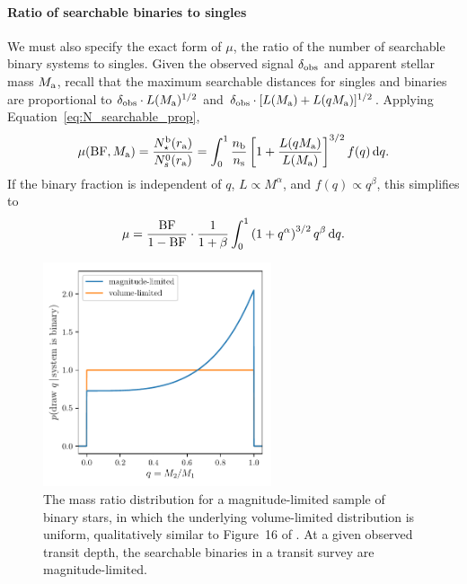 \documentclass[12pt,modern]{aastex61}
\renewcommand{\a}{_{\rm a}}
\begin{document}
\paragraph{Ratio of searchable binaries to singles}
We must also specify the exact form of $\mu$, the ratio of 
the number of searchable binary systems to singles.
Given the observed signal $\delta_{\rm obs}$ and apparent stellar mass $M\a$, 
recall that the maximum searchable distances for singles and binaries are 
proportional to $\delta_{\rm obs}\cdot L(M\a)^{1/2}$ and $\delta_{\rm 
obs}\cdot [L(M\a)+L(qM\a)]^{1/2}$.
Applying Equation~\ref{eq:N_searchable_prop},
\begin{equation}
\mu({\rm BF},M\a) = 
\frac{N_\star^{\rm b}(r\a)}{N_s^0(r\a)}=
\int_0^1 {n_{\rm b}\over n_{\rm s}}\left[1+{L(qM\a) \over L(M\a)}\right]^{3/2} 
f(q)\,\mathrm{d}q.
\label{eq:mu_general}
\end{equation}
If the binary fraction is independent of $q$, $L \propto M^\alpha$, and $f(q) 
\propto q^\beta$, this simplifies to
\begin{equation}
\mu =\frac{{\rm BF}}{1 - {\rm BF}}\cdot {1\over{1+\beta}}\int_0^1 
\left(1+q^\alpha\right)^{3/2} q^\beta \,\mathrm{d}q.
\label{eq:mu_power_laws}
\end{equation}
\begin{figure}[!tb]
    \centering
    \includegraphics[width=0.6\textwidth]{figures/mass_ratio_distribution.pdf}
    \caption{
        The mass ratio distribution for a magnitude-limited sample of 
        binary stars, in which the underlying volume-limited distribution is 
        uniform, qualitatively similar to
        Figure~16 of \citet{raghavan_survey_2010}.
        At a given observed transit depth, the searchable binaries in a 
        transit survey are magnitude-limited.
    }
    \label{fig:q_distribn_mag_limited}
\end{figure}
\end{document}
